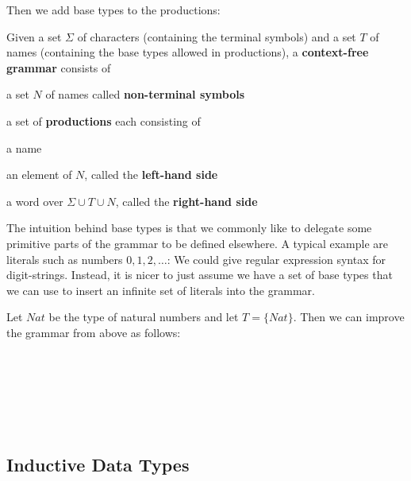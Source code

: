 Then we add base types to the productions:

\begin{definition}
Given a set $\Sigma$ of characters (containing the terminal symbols) and a set $T$ of names (containing the base types allowed in productions), a \textbf{context-free grammar} consists of
\begin{compactitem}
\item a set $N$ of names called \textbf{non-terminal symbols}
\item a set of \textbf{productions} each consisting of
 \begin{compactitem}
  \item a name
  \item an element of $N$, called the \textbf{left-hand side}
  \item a word over $\Sigma\cup T\cup N$, called the \textbf{right-hand side}
 \end{compactitem}
\end{compactitem}
\end{definition}

The intuition behind base types is that we commonly like to delegate some primitive parts of the grammar to be defined elsewhere.
A typical example are literals such as numbers $0, 1, 2,\ldots$: We could give regular expression syntax for digit-strings.
Instead, it is nicer to just assume we have a set of base types that we can use to insert an infinite set of literals into the grammar.

\begin{example}
Let $Nat$ be the type of natural numbers and let $T=\{Nat\}$.
Then we can improve the grammar from above as follows:
\begin{commgrammar}
\\
\\
\\
\\
\\
\end{commgrammar}
\end{example}

\subsection{Inductive Data Types}

